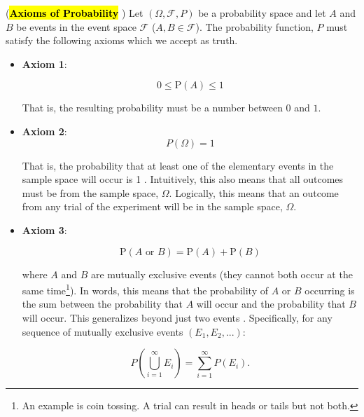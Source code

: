 \begin{df}(\textbf{\hl{Axioms of Probability}} \cite{cs109reader}) 
Let $(\Omega, \mathcal{F}, P)$ be a probability space and let $A$ and $B$ be events in the event space $\mathcal{F}$ ($A, B \in \mathcal{F}$). The probability function, $P$ must satisfy the following axioms which we accept as truth. 

\begin{itemize}
    \item \textbf{Axiom 1}: 
    
    $$0 \leq \mathrm{P}(A) \leq 1$$ 
    
    That is, the resulting probability must be a number between $0$ and $1$. 
    
    \item \textbf{Axiom 2}: $$P(\Omega)=1$$
    
    That is, the probability that at least one of the elementary events in the sample space will occur is 1 \cite{enwiki:probabilityspace}. Intuitively, this also means that all outcomes must be from the sample space, $\Omega$. Logically, this means that an outcome from any trial of the experiment will be in the sample space, $\Omega$.   
    
    \item \textbf{Axiom 3}: 
    
    $$\mathrm{P}(A \text { or } B)=\mathrm{P}(A)+\mathrm{P}(B)$$ 
    
    where $A$ and $B$ are mutually exclusive events (they cannot both occur at the same time\footnote{An example is coin tossing. A trial can result in heads or tails but not both.}). In words, this means that the probability of $A$ or $B$ occurring is the sum between the probability that $A$ will occur and the probability that $B$ will occur. This generalizes beyond just two events \cite{ross2014first}. Specifically, for any sequence of mutually exclusive events $(E_1, E_2,...)$:  
    
    $$
    P\left(\bigcup_{i=1}^{\infty} E_{i}\right)=\sum_{i=1}^{\infty} P\left(E_{i}\right). 
    $$ 
\end{itemize} 
\end{df} 


